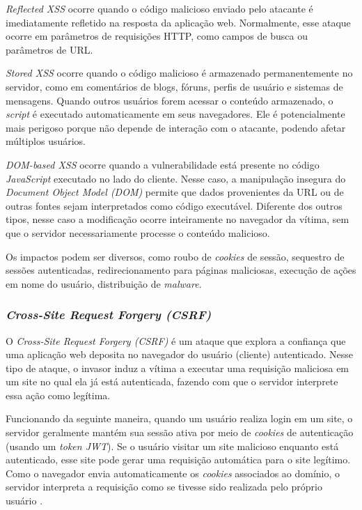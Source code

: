 \textit{Reflected XSS} ocorre quando o código malicioso enviado pelo atacante é imediatamente refletido na resposta da aplicação web. Normalmente, esse ataque ocorre em parâmetros de requisições HTTP, como campos de busca ou parâmetros de URL. 

\textit{Stored XSS} ocorre quando o código malicioso é armazenado permanentemente no servidor, como em comentários de blogs, fóruns, perfis de usuário e sistemas de mensagens. Quando outros usuários forem acessar o conteúdo armazenado, o \textit{script} é executado automaticamente em seus navegadores. Ele é potencialmente mais perigoso porque não depende de interação com o atacante, podendo afetar múltiplos usuários. 

\textit{DOM-based XSS} ocorre quando a vulnerabilidade está presente no código \textit{JavaScript} executado no lado do cliente. Nesse caso, a manipulação insegura do \textit{Document Object Model (DOM)} permite que dados provenientes da URL ou de outras fontes sejam interpretados como código executável. Diferente dos outros tipos, nesse caso a modificação ocorre inteiramente no navegador da vítima, sem que o servidor necessariamente processe o conteúdo malicioso. 

Os impactos podem ser diversos, como roubo de \textit{cookies} de sessão, sequestro de sessões autenticadas, redirecionamento para páginas maliciosas, execução de ações em nome do usuário, distribuição de \textit{malware}. 

\subsubsection{
    \textit{Cross-Site Request Forgery (CSRF)}
}

O \textit{Cross-Site Request Forgery (CSRF)} é um ataque que explora a confiança que uma aplicação web deposita no navegador do usuário (cliente) autenticado. Nesse tipo de ataque, o invasor induz a vítima a executar uma requisição maliciosa em um site no qual ela já está autenticada, fazendo com que o servidor interprete essa ação como legítima.

Funcionando da seguinte maneira, quando um usuário realiza login em um site, o servidor geralmente mantém sua sessão ativa por meio de \textit{cookies} de autenticação (usando um \textit{token JWT}). Se o usuário visitar um site malicioso enquanto está autenticado, esse site pode gerar uma requisição automática para o site legítimo. Como o navegador envia automaticamente os \textit{cookies} associados ao domínio, o servidor interpreta a requisição como se tivesse sido realizada pelo próprio usuário \cite{lin:2009}.

